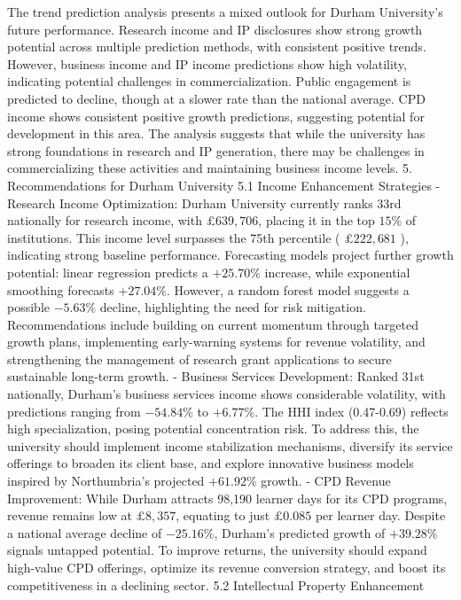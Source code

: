 The trend prediction analysis presents a mixed outlook for Durham University's future performance. Research income and IP disclosures show strong growth potential across multiple prediction methods, with consistent positive trends. However, business income and IP income predictions show high volatility, indicating potential challenges in commercialization. Public engagement is predicted to decline, though at a slower rate than the national average. CPD income shows consistent positive growth predictions, suggesting potential for development in this area. The analysis suggests that while the university has strong foundations in research and IP generation, there may be challenges in commercializing these activities and maintaining business income levels.
5. Recommendations for Durham University
5.1 Income Enhancement Strategies
- Research Income Optimization: Durham University currently ranks 33rd nationally for research income, with $£ 639,706$, placing it in the top $15 \%$ of institutions. This income level surpasses the 75th percentile ( $£ 222,681$ ), indicating strong baseline performance. Forecasting models project further growth potential: linear regression predicts a $+25.70 \%$ increase, while exponential smoothing forecasts $+27.04 \%$. However, a random forest model suggests a possible $-5.63 \%$ decline, highlighting the need for risk mitigation. Recommendations include building on current momentum through targeted growth plans, implementing early-warning systems for revenue volatility, and strengthening the management of research grant applications to secure sustainable long-term growth.
- Business Services Development: Ranked 31st nationally, Durham's business services income shows considerable volatility, with predictions ranging from $-54.84 \%$ to $+6.77 \%$. The HHI index (0.47-0.69) reflects high specialization, posing potential concentration risk. To address this, the university should implement income stabilization mechanisms, diversify its service offerings to broaden its client base, and explore innovative business models inspired by Northumbria's projected $+61.92 \%$ growth.
- CPD Revenue Improvement: While Durham attracts 98,190 learner days for its CPD programs, revenue remains low at $£ 8,357$, equating to just $£ 0.085$ per learner day. Despite a national average decline of $-25.16 \%$, Durham's predicted growth of $+39.28 \%$ signals untapped potential. To improve returns, the university should expand high-value CPD offerings, optimize its revenue conversion strategy, and boost its competitiveness in a declining sector.
5.2 Intellectual Property Enhancement
